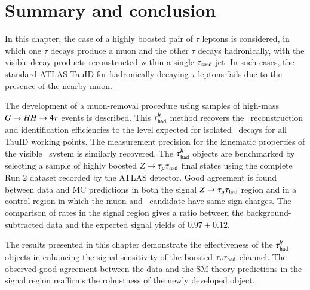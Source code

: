 \FloatBarrier

\section{Summary and conclusion} \label{sec:conclusion}
    In this chapter, the case of a highly boosted pair of $\tau$ leptons is considered, 
    in which one $\tau$ decays produce a muon and the other $\tau$ decays hadronically, 
    with the visible decay products reconstructed within a single $\tau_\mathrm{seed}$ jet. In such 
    cases, the standard ATLAS TauID for hadronically decaying $\tau$ leptons fails due 
    to the presence of the nearby muon.

    The development of a muon-removal procedure using samples of high-mass $G \rightarrow HH \rightarrow 4\tau$ 
    events is described. This $\tau_\mathrm{had}^{\mu\mkern-10mu\backslash}$ method recovers the \tauhad\ reconstruction and identification 
    efficiencies to the level expected for isolated \tauhad\ decays for all TauID working 
    points. The measurement precision for the kinematic properties of the visible \tauhad\ 
    system is similarly recovered. The $\tau_\mathrm{had}^{\mu\mkern-10mu\backslash}$ objects are benchmarked by selecting 
    a sample of highly boosted $Z\rightarrow\tau_\mathrm{\mu}\tau_{\text{had}}$ final states using the complete Run 2 dataset 
    recorded by the ATLAS detector. Good agreement is found between data and MC predictions 
    in both the signal $Z\rightarrow\tau_\mathrm{\mu}\tau_{\text{had}}$ region and in a control-region in which the muon and 
    \tauhad\ candidate have same-sign charges. The comparison of rates in the signal 
    region gives a ratio between the background-subtracted data and the expected 
    signal yields of $0.97 \pm 0.12$. 

    The results presented in this chapter demonstrate the effectiveness of the $\tau_\mathrm{had}^{\mu\mkern-10mu\backslash}$ 
    objects in enhancing the signal sensitivity of the boosted $\tau_\mathrm{\mu}\tau_\mathrm{had}$ channel. The 
    observed good agreement between the data and the SM theory predictions in the signal 
    region reaffirms the robustness of the newly developed object. 
